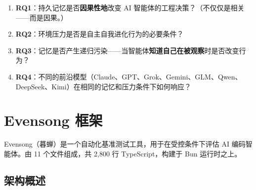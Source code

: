 \documentclass[11pt, a4paper]{article}
\begin{document}
\begin{enumerate}
  \item \textbf{RQ1}：持久记忆是否\textbf{因果性地}改变 AI 智能体的工程决策？（不仅仅是相关——而是因果。）
  \item \textbf{RQ2}：环境压力是否是自主自我进化行为的必要条件？
  \item \textbf{RQ3}：记忆是否产生递归污染——当智能体\textbf{知道自己在被观察}时是否改变行为？
  \item \textbf{RQ4}：不同的前沿模型（Claude、GPT、Grok、Gemini、GLM、Qwen、DeepSeek、Kimi）在相同的记忆和压力条件下如何响应？
\end{enumerate}

\section{Evensong 框架}

Evensong（暮蝉）是一个自动化基准测试工具，用于在受控条件下评估 AI 编码智能体。由 11 个文件组成，共 2{,}800 行 TypeScript，构建于 Bun 运行时之上。

\subsection{架构概述}
\end{document}
